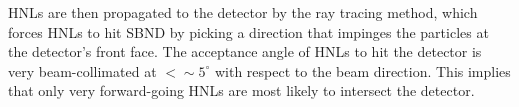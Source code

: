 HNLs are then propagated to the detector by the ray tracing method, which forces HNLs to hit SBND by picking a direction that impinges the particles at the detector's front face.  
The acceptance angle of HNLs to hit the detector is very beam-collimated at $< \sim 5^\circ$ with respect to the beam direction.
This implies that only very forward-going HNLs are most likely to intersect the detector.

%


